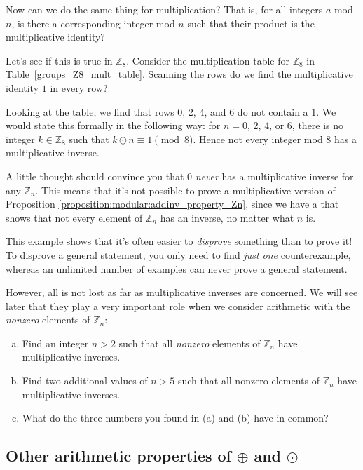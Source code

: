 Now can we do the same thing for multiplication? That is, for all integers $a$ mod $n$, is there a corresponding integer mod $n$ such that their product is the multiplicative identity?  

Let's see if this is true in ${\mathbb Z}_8$. Consider the multiplication table for ${\mathbb Z}_8$ in Table~\ref{groups_Z8_mult_table}.  Scanning the rows do we find the multiplicative identity $1$ in every row?   

Looking at the table, we find that  rows 0, 2, 4, and 6 do not contain a $1$. We would state this formally in the following way:  for $n = 0$, 2,  4, or 6, there is no integer $k \in {\mathbb Z}_8$ such that $k \odot n \equiv 1 \pmod{ 8}$.  Hence not every integer mod 8 has a multiplicative inverse. 

A little thought should convince you that 0 \emph{never} has a multiplicative inverse for any ${\mathbb Z}_n$. This means that it's not possible to prove a multiplicative version of Proposition \ref{proposition:modular:addinv_property_Zn}, since we have a  that shows that not every element of ${\mathbb Z}_n$ has an inverse, no matter what $n$ is.

\begin{rem}
This example shows that it's often easier to \emph{disprove} something than to prove it!  To disprove a general statement, you only need to find \emph{just one} counterexample, whereas an unlimited number of examples can never prove a general statement.
\end{rem}

However, all is not lost as far as multiplicative inverses are concerned. We will see later that they play a very important role when we consider arithmetic with the \emph{nonzero} elements of ${\mathbb Z}_n$:

\begin{exercise}{60}
\begin{enumerate}[(a)]
\item
Find an integer $n>2$ such that all \emph{nonzero} elements of ${\mathbb Z}_n$ have multiplicative inverses.
\item
Find two additional values of $n>5$ such that all nonzero elements of ${\mathbb Z}_n$ have multiplicative inverses.
\item
What do the three numbers you found in (a) and (b) have in common?
\end{enumerate}
\end{exercise}

\subsection{Other arithmetic properties of $\oplus$ and $\odot$}

